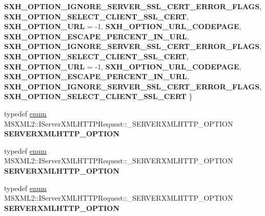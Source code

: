 \begin{DoxyCompactItemize}
{\bfseries S\+X\+H\+\_\+\+O\+P\+T\+I\+O\+N\+\_\+\+I\+G\+N\+O\+R\+E\+\_\+\+S\+E\+R\+V\+E\+R\+\_\+\+S\+S\+L\+\_\+\+C\+E\+R\+T\+\_\+\+E\+R\+R\+O\+R\+\_\+\+F\+L\+A\+GS}, 
\newline
{\bfseries S\+X\+H\+\_\+\+O\+P\+T\+I\+O\+N\+\_\+\+S\+E\+L\+E\+C\+T\+\_\+\+C\+L\+I\+E\+N\+T\+\_\+\+S\+S\+L\+\_\+\+C\+E\+RT}, 
{\bfseries S\+X\+H\+\_\+\+O\+P\+T\+I\+O\+N\+\_\+\+U\+RL} = -\/1, 
{\bfseries S\+X\+H\+\_\+\+O\+P\+T\+I\+O\+N\+\_\+\+U\+R\+L\+\_\+\+C\+O\+D\+E\+P\+A\+GE}, 
{\bfseries S\+X\+H\+\_\+\+O\+P\+T\+I\+O\+N\+\_\+\+E\+S\+C\+A\+P\+E\+\_\+\+P\+E\+R\+C\+E\+N\+T\+\_\+\+I\+N\+\_\+\+U\+RL}, 
\newline
{\bfseries S\+X\+H\+\_\+\+O\+P\+T\+I\+O\+N\+\_\+\+I\+G\+N\+O\+R\+E\+\_\+\+S\+E\+R\+V\+E\+R\+\_\+\+S\+S\+L\+\_\+\+C\+E\+R\+T\+\_\+\+E\+R\+R\+O\+R\+\_\+\+F\+L\+A\+GS}, 
{\bfseries S\+X\+H\+\_\+\+O\+P\+T\+I\+O\+N\+\_\+\+S\+E\+L\+E\+C\+T\+\_\+\+C\+L\+I\+E\+N\+T\+\_\+\+S\+S\+L\+\_\+\+C\+E\+RT}, 
{\bfseries S\+X\+H\+\_\+\+O\+P\+T\+I\+O\+N\+\_\+\+U\+RL} = -\/1, 
{\bfseries S\+X\+H\+\_\+\+O\+P\+T\+I\+O\+N\+\_\+\+U\+R\+L\+\_\+\+C\+O\+D\+E\+P\+A\+GE}, 
\newline
{\bfseries S\+X\+H\+\_\+\+O\+P\+T\+I\+O\+N\+\_\+\+E\+S\+C\+A\+P\+E\+\_\+\+P\+E\+R\+C\+E\+N\+T\+\_\+\+I\+N\+\_\+\+U\+RL}, 
{\bfseries S\+X\+H\+\_\+\+O\+P\+T\+I\+O\+N\+\_\+\+I\+G\+N\+O\+R\+E\+\_\+\+S\+E\+R\+V\+E\+R\+\_\+\+S\+S\+L\+\_\+\+C\+E\+R\+T\+\_\+\+E\+R\+R\+O\+R\+\_\+\+F\+L\+A\+GS}, 
{\bfseries S\+X\+H\+\_\+\+O\+P\+T\+I\+O\+N\+\_\+\+S\+E\+L\+E\+C\+T\+\_\+\+C\+L\+I\+E\+N\+T\+\_\+\+S\+S\+L\+\_\+\+C\+E\+RT}
 \}
\item 
\mbox{\label{interface_m_s_x_m_l2_1_1_i_server_x_m_l_h_t_t_p_request_a016090769f789f8ddb7bb8797c3fd793}} 
typedef \hyperlink{interfaceenum}{enum} M\+S\+X\+M\+L2\+::\+I\+Server\+X\+M\+L\+H\+T\+T\+P\+Request\+::\+\_\+\+S\+E\+R\+V\+E\+R\+X\+M\+L\+H\+T\+T\+P\+\_\+\+O\+P\+T\+I\+ON {\bfseries S\+E\+R\+V\+E\+R\+X\+M\+L\+H\+T\+T\+P\+\_\+\+O\+P\+T\+I\+ON}
\item 
\mbox{\label{interface_m_s_x_m_l2_1_1_i_server_x_m_l_h_t_t_p_request_a016090769f789f8ddb7bb8797c3fd793}} 
typedef \hyperlink{interfaceenum}{enum} M\+S\+X\+M\+L2\+::\+I\+Server\+X\+M\+L\+H\+T\+T\+P\+Request\+::\+\_\+\+S\+E\+R\+V\+E\+R\+X\+M\+L\+H\+T\+T\+P\+\_\+\+O\+P\+T\+I\+ON {\bfseries S\+E\+R\+V\+E\+R\+X\+M\+L\+H\+T\+T\+P\+\_\+\+O\+P\+T\+I\+ON}
\item 
\mbox{\label{interface_m_s_x_m_l2_1_1_i_server_x_m_l_h_t_t_p_request_a016090769f789f8ddb7bb8797c3fd793}} 
typedef \hyperlink{interfaceenum}{enum} M\+S\+X\+M\+L2\+::\+I\+Server\+X\+M\+L\+H\+T\+T\+P\+Request\+::\+\_\+\+S\+E\+R\+V\+E\+R\+X\+M\+L\+H\+T\+T\+P\+\_\+\+O\+P\+T\+I\+ON {\bfseries S\+E\+R\+V\+E\+R\+X\+M\+L\+H\+T\+T\+P\+\_\+\+O\+P\+T\+I\+ON}
\end{DoxyCompactItemize}
